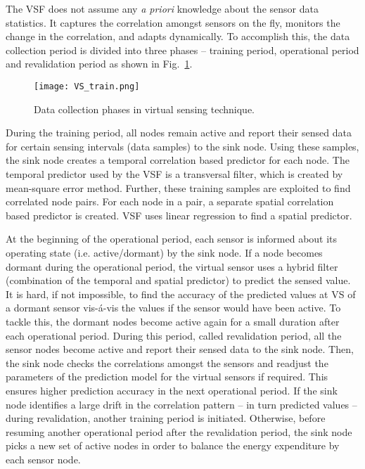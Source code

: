 \documentclass[conference]{IEEEtran}
\begin{document}
The VSF does not assume any \textit{a priori} knowledge about the sensor data statistics. It captures the correlation amongst sensors on the fly, monitors the change in the correlation, and adapts dynamically. To accomplish this, the data collection period is divided into three phases -- training period, operational period and revalidation period as shown in Fig.~\ref{fig:vs_train}. 
\begin{figure}
\centering
\texttt{[image: VS\_train.png]}
\caption{Data collection phases in virtual sensing technique.}
\label{fig:vs_train}
\end{figure}

During the training period, all nodes remain active and report their sensed data for certain sensing intervals (data samples) to the sink node. Using these samples, the sink node creates a temporal correlation based predictor for each node. The temporal predictor used by the VSF is a transversal filter, which is created by mean-square error method. Further, these training samples are exploited to find correlated node pairs. For each node in a pair, a separate spatial correlation based predictor is created. VSF uses linear regression to find a spatial predictor. 

At the beginning of the operational period, each sensor is informed about its operating state (i.e. active/dormant) by the sink node. If a node becomes dormant during the operational period, the virtual sensor uses a hybrid filter (combination of the temporal and spatial predictor) to predict the sensed value.
It is hard, if not impossible, to find the accuracy of the predicted values at VS of a dormant sensor vis-\'a-vis the values if the sensor would have been active. To tackle this, the dormant nodes become active again for a small duration after each operational period. During this period, called revalidation period, all the sensor nodes become active and report their sensed data to the sink node. Then, the sink node checks the correlations amongst the sensors and readjust the parameters of the prediction model for the virtual sensors if required. This ensures higher prediction accuracy in the next operational period. If the sink node identifies a large drift in the correlation pattern -- in turn predicted values -- during revalidation, another training period is initiated. Otherwise, before resuming another operational period after the revalidation period, the sink node picks a new set of active nodes in order to balance the energy expenditure by each sensor node.
\end{document}
